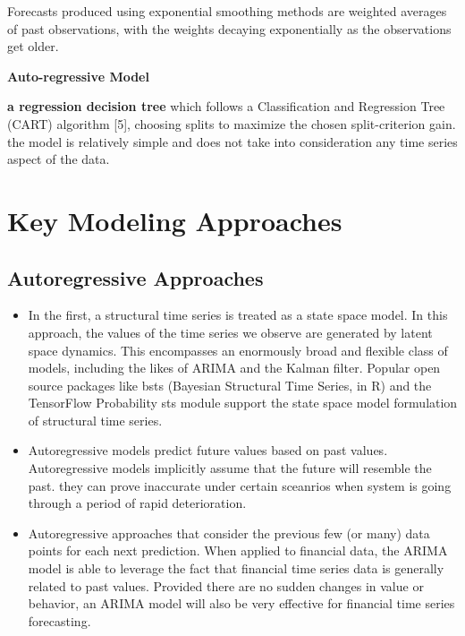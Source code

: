 \documentclass[openany]{book}
\begin{document}
Forecasts produced using exponential smoothing methods are weighted averages of past observations, with the weights decaying exponentially as the observations get older.

\textbf{Auto-regressive Model}

\textbf{a regression decision tree} which follows a Classification and Regression Tree (CART) algorithm [5], choosing splits to maximize the chosen split-criterion gain.  the model is relatively simple and does not take into consideration any time series aspect of the data. 








\section{Key Modeling Approaches}


\subsection{Autoregressive Approaches}

\begin{itemize}

    \item  In the first, a structural time series is treated as a state space model. In this approach, the values of the time series we observe are generated by latent space dynamics. This encompasses an enormously broad and flexible class of models, including the likes of ARIMA and the Kalman filter. Popular open source packages like bsts (Bayesian Structural Time Series, in R) and the TensorFlow Probability sts module support the state space model formulation of structural time series.
    
    \item Autoregressive models predict future values based on past values. Autoregressive models implicitly assume that the future will resemble the past.  they can prove inaccurate under certain sceanrios when system is going through a period of rapid deterioration. 

    \item  Autoregressive approaches that consider the previous few (or many) data points for each next prediction.  When applied to financial data, the ARIMA model is able to leverage the fact that financial time series data is generally related to past values. Provided there are no sudden changes in value or behavior, an ARIMA model will also be very effective for financial time series forecasting. 

\end{itemize}
\end{document}
